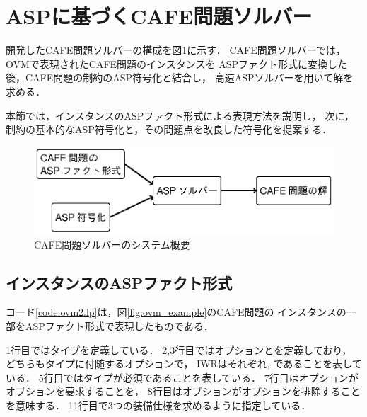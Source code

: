 \section{ASPに基づくCAFE問題ソルバー}

開発したCAFE問題ソルバーの構成を図\ref{fig:system}に示す．
CAFE問題ソルバーでは，OVMで表現されたCAFE問題のインスタンスを
ASPファクト形式に変換した後，CAFE問題の制約のASP符号化と結合し，
高速ASPソルバーを用いて解を求める．

本節では，インスタンスのASPファクト形式による表現方法を説明し，
次に，制約の基本的なASP符号化と，その問題点を改良した符号化を提案する．

\begin{figure}[tb]
 \includegraphics [width=\linewidth]{images/system.eps}
 \caption{CAFE問題ソルバーのシステム概要}
 \label{fig:system}
\end{figure}

\subsection{インスタンスのASPファクト形式}
 

コード\ref{code:ovm2.lp}は，図\ref{fig:ovm_example}のCAFE問題の
インスタンスの一部をASPファクト形式で表現したものである．

1行目ではタイプを定義している．
2,3行目ではオプションとを定義しており，
どちらもタイプに付随するオプションで，
IWRはそれぞれ, であることを表している．
5行目ではタイプが必須であることを表している．
7行目はオプションがオプションを要求することを，
8行目はオプションがオプションを排除することを意味する．
11行目で3つの装備仕様を求めるように指定している．




